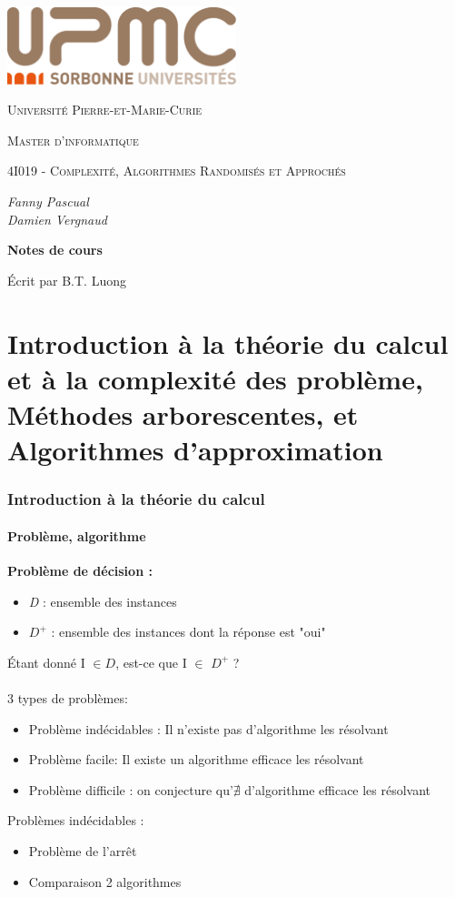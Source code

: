 \documentclass[12pt,a4paper]{article}
\begin{document}
\begin{titlepage}
	\centering
	\includegraphics[width=0.5\textwidth]{UPMC.png}\par\vspace{1cm}
	{\scshape\LARGE Université Pierre-et-Marie-Curie \par}
	\vspace{1cm}
	{\scshape\large Master d'informatique \par}
	\vspace{1cm}
	{\scshape\Large 4I019 - Complexité, Algorithmes Randomisés et Approchés\par}
	\vspace{1.5cm}
	{\Large\itshape Fanny Pascual\\Damien Vergnaud\par}
	\vspace{2cm}
	{\huge\bfseries Notes de cours\par}
	\vfill
	Écrit par B.T. Luong\par 
	\vfill
\end{titlepage}
\newpage
\tableofcontents
\newpage
\part{Introduction à la théorie du calcul et à la complexité des problème, Méthodes arborescentes, et Algorithmes d'approximation}
\section{Introduction à la théorie du calcul}
\subsection{Problème, algorithme}
\textbf{Problème de décision :}
\begin{itemize}
	\item \textit{D} : ensemble des instances
	\item $D^+$ : ensemble des instances dont la réponse est "oui"
\end{itemize}
Étant donné I $\in D$, est-ce que I $\in$ $D^+$ ?\\\\
3 types de problèmes:
\begin{itemize}
	\item Problème indécidables : Il n'existe pas d'algorithme les résolvant
	\item Problème facile: Il existe un algorithme efficace les résolvant
	\item Problème difficile : on conjecture qu'$\nexists$ d'algorithme efficace les résolvant\\
\end{itemize}
Problèmes indécidables : 
\begin{itemize}
	\item Problème de l'arrêt
	\item Comparaison 2 algorithmes
\end{itemize}
\end{document}
